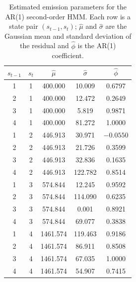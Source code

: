 \begin{table}[H]
\centering
\begin{tabular}{ccccc}
\hline
$s_{t-1}$ & $s_t$ & $\hat{\mu}$ & $\hat{\sigma}$ & $\hat{\phi}$ \\
\hline
1 & 1 &  400.000 &   10.009 &  0.6797 \\
2 & 1 &  400.000 &   12.472 &  0.2649 \\
3 & 1 &  400.000 &    5.819 &  0.9871 \\
4 & 1 &  400.000 &   81.272 &  1.0000 \\
\hline
1 & 2 &  446.913 &   30.971 & $-0.0550$ \\
2 & 2 &  446.913 &   21.726 &  0.3599 \\
3 & 2 &  446.913 &   32.836 &  0.1635 \\
4 & 2 &  446.913 &  122.782 &  0.8514 \\
\hline
1 & 3 &  574.844 &   12.245 &  0.9592 \\
2 & 3 &  574.844 &  114.090 &  0.6235 \\
3 & 3 &  574.844 &    0.001 &  0.8921 \\
4 & 3 &  574.844 &   69.077 &  0.3838 \\
\hline
1 & 4 & 1461.574 &  119.463 &  0.9186 \\
2 & 4 & 1461.574 &   86.911 &  0.8508 \\
3 & 4 & 1461.574 &   67.035 &  1.0000 \\
4 & 4 & 1461.574 &   54.907 &  0.7415 \\
\hline
\end{tabular}
\caption{Estimated emission parameters for the AR(1) second-order HMM. Each row is a state pair $(s_{t-1}, s_t)$; $\hat{\mu}$ and $\hat{\sigma}$ are the Gaussian mean and standard deviation of the residual and $\hat{\phi}$ is the AR(1) coefficient.}
\label{tab:second_order_hmm_emissions}
\end{table}
